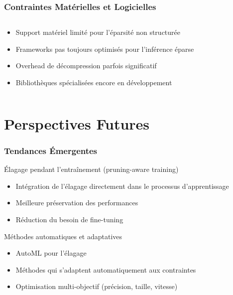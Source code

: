 \documentclass[10pt]{beamer}
\begin{document}
\begin{frame}
\frametitle{Contraintes Matérielles et Logicielles}
\begin{columns}
\begin{column}{0.5\textwidth}
\begin{itemize}
    \item Support matériel limité pour l'éparsité non structurée
    \item Frameworks pas toujours optimisés pour l'inférence éparse
    \item Overhead de décompression parfois significatif
    \item Bibliothèques spécialisées encore en développement
\end{itemize}
\end{column}
\begin{column}{0.5\textwidth}
\centering
{}
\end{column}
\end{columns}
\end{frame}

\section{Perspectives Futures}

\begin{frame}
\frametitle{Tendances Émergentes}
\begin{block}{Élagage pendant l'entraînement (pruning-aware training)}
\begin{itemize}
    \item Intégration de l'élagage directement dans le processus d'apprentissage
    \item Meilleure préservation des performances
    \item Réduction du besoin de fine-tuning
\end{itemize}
\end{block}

\begin{block}{Méthodes automatiques et adaptatives}
\begin{itemize}
    \item AutoML pour l'élagage
    \item Méthodes qui s'adaptent automatiquement aux contraintes
    \item Optimisation multi-objectif (précision, taille, vitesse)
\end{itemize}
\end{block}
\end{frame}
\end{document}
